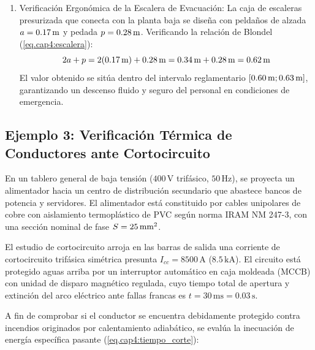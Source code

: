 \begin{enumerate}
          de la planta para impedir que un foco ígneo anule simultáneamente ambas vías de evacuación, verificando que la
          distancia máxima hacia cualquiera de ellas no supere los $40\m$.
    \item Verificación Ergonómica de la Escalera de Evacuación: La caja de escaleras presurizada que conecta con la planta
          baja se diseña con peldaños de alzada $a = 0.17\,\mathrm{m}$ y pedada $p = 0.28\,\mathrm{m}$. Verificando la relación de Blondel
          (\ref{eq.cap4:escalera}):
          \begin{equation}
          2a + p = 2(0.17\,\mathrm{m}) + 0.28\,\mathrm{m} = 0.34\,\mathrm{m} + 0.28\,\mathrm{m} = 0.62\,\mathrm{m}
          \end{equation}
          El valor obtenido se sitúa dentro del intervalo reglamentario $[0.60\,\mathrm{m}; 0.63\,\mathrm{m}]$, garantizando un descenso fluido
          y seguro del personal en condiciones de emergencia.
\end{enumerate}

\subsection{Ejemplo 3: Verificación Térmica de Conductores ante Cortocircuito}
\label{sec.cap4:ejemplo_cortocircuito}

En un tablero general de baja tensión ($400\,\mathrm{V}$ trifásico, $50\,\mathrm{Hz}$), se proyecta un alimentador hacia un
centro de distribución secundario que abastece bancos de potencia y servidores. El alimentador está constituido por cables
unipolares de cobre con aislamiento termoplástico de PVC según norma IRAM NM 247-3, con una sección nominal de fase
$S = 25\,\mathrm{mm}^2$.

El estudio de cortocircuito arroja en las barras de salida una corriente de cortocircuito trifásica simétrica presunta
$I_{cc} = 8500\,\mathrm{A}$ ($8.5\,\mathrm{kA}$). El circuito está protegido aguas arriba por un interruptor automático en
caja moldeada (MCCB) con unidad de disparo magnético regulada, cuyo tiempo total de apertura y extinción del arco eléctrico
ante fallas francas es $t = 30\,\mathrm{ms} = 0.03\,\mathrm{s}$.

A fin de comprobar si el conductor se encuentra debidamente protegido contra incendios originados por calentamiento
adiabático, se evalúa la inecuación de energía específica pasante (\ref{eq.cap4:tiempo_corte}):

